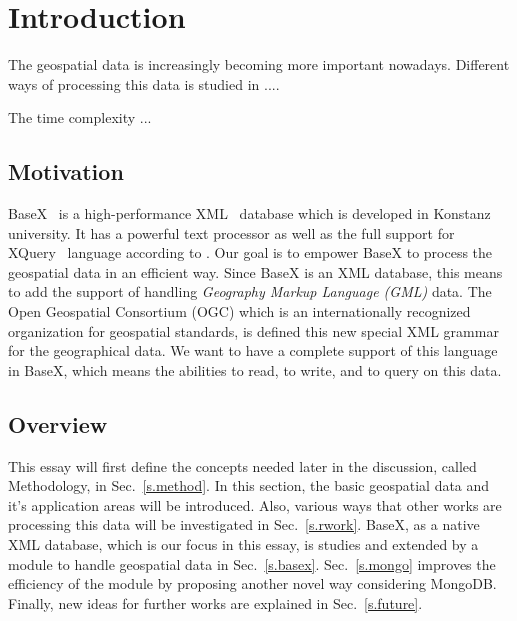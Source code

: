 \documentclass[a4paper,12pt]{article}
\begin{document}
\newpage
\tableofcontents

\thispagestyle{empty}
\newpage
\section{Introduction}
\setcounter{page}{1}
The geospatial data is increasingly becoming more important nowadays.
Different ways of processing this data is studied in ....

The time complexity ...

\subsection{Motivation}
BaseX~\cite{www/basex} is a high-performance XML~\cite{www/xml}
 database which is developed in Konstanz university.
It has a powerful text processor as well as the full support 
for XQuery~\cite{www/xquery,www/xqueryfun} language according to \cite{conf/xsym/GrunGHS09}.
Our goal is to empower BaseX to process the geospatial data in an efficient way.
Since BaseX is an XML database, this means to add the support of handling 
\emph{Geography Markup Language (GML)} data. The Open Geospatial Consortium (OGC)
which is an internationally recognized organization for geospatial standards,
is defined this new special XML grammar for the geographical data.
We want to have a complete support of this language in BaseX,
which means the abilities to read, to write, and to query on this data.


\subsection{Overview}
This essay will first define the concepts needed later in the discussion, called
Methodology, in Sec.~\ref{s.method}. In this section, the basic geospatial data
and it's application areas will be introduced. Also, various ways that other works
are processing this data will be investigated in Sec.~\ref{s.rwork}. BaseX,
as a native XML database, which is our focus in this essay, is studies and extended
by a module to handle geospatial data in Sec.~\ref{s.basex}. 
Sec.~\ref{s.mongo} improves the efficiency of the module
by proposing another novel way considering MongoDB.
Finally, new ideas for further works are explained in
Sec.~\ref{s.future}.


\newpage
\end{document}
